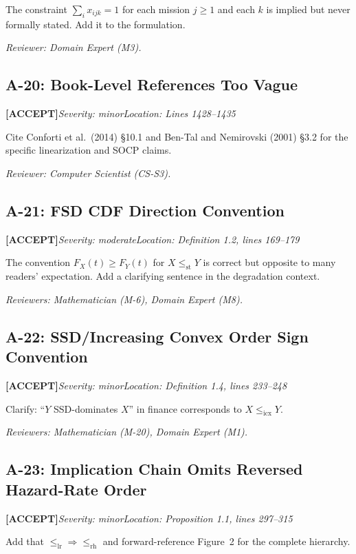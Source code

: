 \documentclass[11pt,a4paper]{article}
\newcommand{\acceptlabel}{\textbf{\textcolor{acceptgreen}{[ACCEPT]}}}
\begin{document}
The constraint $\sum_i x_{ijk}=1$ for each mission $j\ge1$ and each $k$ is implied but never formally stated. Add it to the formulation.

\textit{Reviewer: Domain Expert (M3).}

\subsection{A-20: Book-Level References Too Vague}
\acceptlabel\quad\textit{Severity: minor}\quad\textit{Location: Lines 1428--1435}

Cite Conforti et al.\ (2014) \S10.1 and Ben-Tal and Nemirovski (2001) \S3.2 for the specific linearization and SOCP claims.

\textit{Reviewer: Computer Scientist (CS-S3).}

\subsection{A-21: FSD CDF Direction Convention}
\acceptlabel\quad\textit{Severity: moderate}\quad\textit{Location: Definition 1.2, lines 169--179}

The convention $F_X(t)\ge F_Y(t)$ for $X\le_{\mathrm{st}}Y$ is correct but opposite to many readers' expectation. Add a clarifying sentence in the degradation context.

\textit{Reviewers: Mathematician (M-6), Domain Expert (M8).}

\subsection{A-22: SSD/Increasing Convex Order Sign Convention}
\acceptlabel\quad\textit{Severity: minor}\quad\textit{Location: Definition 1.4, lines 233--248}

Clarify: ``$Y$ SSD-dominates $X$'' in finance corresponds to $X\le_{\mathrm{icx}}Y$.

\textit{Reviewers: Mathematician (M-20), Domain Expert (M1).}

\subsection{A-23: Implication Chain Omits Reversed Hazard-Rate Order}
\acceptlabel\quad\textit{Severity: minor}\quad\textit{Location: Proposition 1.1, lines 297--315}

Add that $\le_{\mathrm{lr}}\Rightarrow\le_{\mathrm{rh}}$ and forward-reference Figure~2 for the complete hierarchy.
\end{document}

